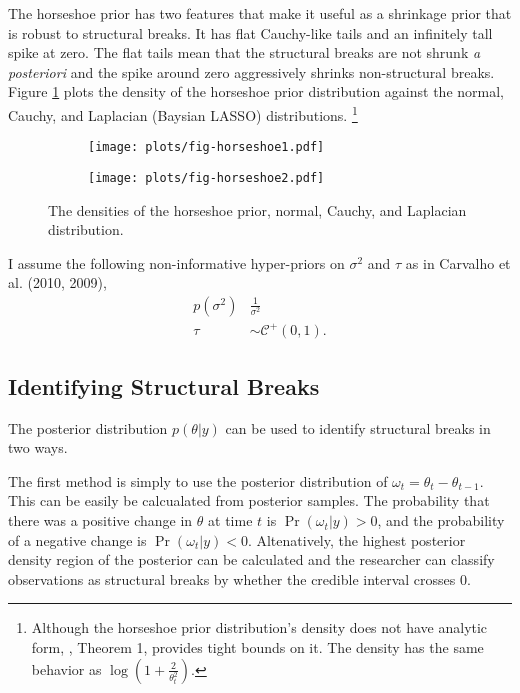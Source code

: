 \documentclass{article}
\newcommand{\paren}[1]{\ensuremath{\left(#1\right)}}
\newcommand{\dhalfcauchy}[1]{\ensuremath{\mathcal{C}^{+}\paren{#1}}}
\begin{document}
The horseshoe prior has two features that make it useful as a shrinkage prior that is robust to structural breaks.
It has flat Cauchy-like tails and an infinitely tall spike at zero.
The flat tails mean that the structural breaks are not shrunk \textit{a posteriori} and the spike around zero aggressively shrinks non-structural breaks.
Figure \ref{fig:horseshoe} plots the density of the horseshoe prior distribution against the normal, Cauchy, and Laplacian (Baysian LASSO) distributions.%
\footnote{
  Although the horseshoe prior distribution's density does not have analytic form, \textcite{CarvalhoPolsonScott2010}, Theorem 1, provides tight bounds on it.
  The density has the same behavior as $\log (1 + \frac{2}{\theta_{t}^{2}})$.
}

\begin{figure}
  \centering
  \begin{subfigure}[b]{0.5\textwidth}
    \texttt{[image: plots/fig-horseshoe1.pdf]}
  \end{subfigure}%
  \begin{subfigure}[b]{0.5\textwidth}
    \texttt{[image: plots/fig-horseshoe2.pdf]}
  \end{subfigure}
  \caption{The densities of the horseshoe prior, normal, Cauchy, and Laplacian distribution.}
  \label{fig:horseshoe}
\end{figure}

I assume the following non-informative hyper-priors on $\sigma^{2}$ and $\tau$ as in Carvalho et al. (2010, 2009),
\begin{align}
  \label{eq:9}
  p(\sigma^{2}) & \frac{1}{\sigma^{2}}  \\
  \label{eq:11}
  \tau &\sim \dhalfcauchy{0, 1} \text{.}
\end{align}

\subsection{Identifying Structural Breaks}
\label{sec:ident-struct-breaks}

The posterior distribution $p(\theta | y)$ can be used to identify structural breaks in two ways. 

The first method is simply to use the posterior distribution of $\omega_{t} = \theta_{t} - \theta_{t-1}$.
This can be easily be calcualated from posterior samples.
The probability that there was a positive change in $\theta$ at time $t$ is
$\Pr(\omega_{t} | y) > 0$, and the probability of a negative change is $\Pr(\omega_{t} | y) < 0$.
Altenatively, the highest posterior density region of the posterior can be calculated and the researcher can classify observations as structural breaks by whether the credible interval crosses 0.
\end{document}
